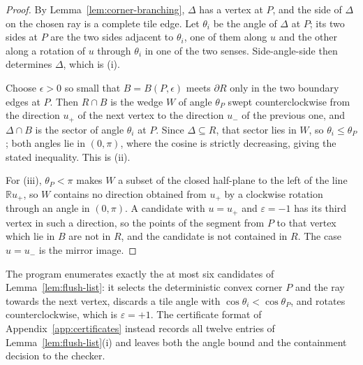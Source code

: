 \documentclass[11pt]{amsart}
\theoremstyle{definition}
\theoremstyle{remark}
\begin{document}
\begin{proof}
By Lemma~\ref{lem:corner-branching}, $\Delta$ has a vertex at $P$, and the
side of $\Delta$ on the chosen ray is a complete tile edge.  Let $\theta_i$
be the angle of $\Delta$ at $P$; its two sides at $P$ are the two sides
adjacent to $\theta_i$, one of them along $u$ and the other along a rotation
of $u$ through $\theta_i$ in one of the two senses.  Side-angle-side then
determines $\Delta$, which is (i).

Choose $\epsilon>0$ so small that $B=B(P,\epsilon)$ meets $\partial R$ only
in the two boundary edges at $P$.  Then $R\cap B$ is the wedge $W$ of angle
$\theta_P$ swept counterclockwise from the direction $u_+$ of the next vertex
to the direction $u_-$ of the previous one, and $\Delta\cap B$ is the sector
of angle $\theta_i$ at $P$.  Since $\Delta\subseteq R$, that sector lies in
$W$, so $\theta_i\le\theta_P$; both angles lie in $(0,\pi)$, where the cosine
is strictly decreasing, giving the stated inequality.  This is (ii).

For (iii), $\theta_P<\pi$ makes $W$ a subset of the closed half-plane to the
left of the line $\mathbb Ru_+$, so $W$ contains no direction obtained from
$u_+$ by a clockwise rotation through an angle in $(0,\pi)$.  A candidate
with $u=u_+$ and $\varepsilon=-1$ has its third vertex in such a direction,
so the points of the segment from $P$ to that vertex which lie in $B$ are not
in $R$, and the candidate is not contained in $R$.  The case $u=u_-$ is the
mirror image.
\end{proof}

The program enumerates exactly the at most six candidates of
Lemma~\ref{lem:flush-list}: it selects the deterministic convex corner
$P$ and the ray towards the next vertex, discards a tile angle with
$\cos\theta_i<\cos\theta_P$, and rotates counterclockwise, which is
$\varepsilon=+1$.  The certificate format of
Appendix~\ref{app:certificates} instead records all twelve entries of
Lemma~\ref{lem:flush-list}(i) and leaves both the angle bound and the
containment decision to the checker.
\end{document}

